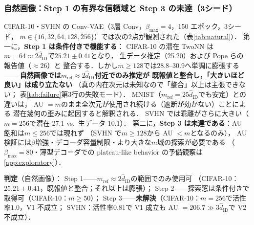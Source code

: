 \documentclass[11pt,a4paper]{jsarticle}
\newcommand{\hatdID}{\hat{d}_{\mathrm{ID}}}
\begin{document}
\subsubsection{自然画像：Step 1 の有界な信頼域と Step 3 の未達（3シード）}

CIFAR-10・SVHN の Conv-VAE（3層 Conv，$\beta_{\max} = 4$，150 エポック，3シード，
$m \in \{16, 32, 64, 128, 256\}$）では次の2点が観測された（表\ref{tab:natural}）．
第一に，\textbf{Step 1 は条件付きで機能する}：
CIFAR-10 の潜在 TwoNN は$m = 64 \approx 2\hatdID$で$25.21 \pm 0.41$となり，
生データ推定（25.20）および Pope ら\cite{pope2021intrinsic}の報告値（$\approx 26$）と
整合する．しかし$m \geq 128$では$28.8$--$30.9$へ単調に膨張する——
\textbf{自然画像では$m_{\mathrm{ref}} \approx 2\hatdID$付近でのみ推定が
既報値と整合し，「大きいほど良い」は成り立たない}
（真の内在次元は未知なので「整合」以上は主張できない；
表\ref{tab:failure}第3行の失敗モード）．
MNIST（$m_{\mathrm{ref}} = 25\hatdID$でも安定）との違いは，
AU $= m$のまま全次元が使用され続ける（遮断が効かない）ことによる
潜在幾何の歪みに起因すると解釈される．
SVHN では乖離がさらに大きい（$m = 256$で潜在 27.1 vs.\ 生データ 10.1）．
第二に，\textbf{Step 3 は未達である}：AU 飽和は$m \leq 256$では現れず
（SVHN で$m \geq 128$から AU $< m$となるのみ），
AU 検証には$\beta$増強・デコーダ容量制限・より大きな$m$域の探索が必要である
（$\beta_{\max} = 80$・薄型デコーダでの plateau-like behavior の予備観察は
\ref{app:exploratory}）．

\textbf{判定}（自然画像）：
Step 1——$m_{\mathrm{ref}} \approx 2\hatdID$の範囲でのみ使用可
（CIFAR-10：$25.21 \pm 0.41$，既報値と整合；それ以上は膨張）；
Step 2——探索窓は条件付きで取得可（CIFAR-10：$m \geq 50$）；
Step 3——\textbf{未解決}（CIFAR-10：$m = 256$で活性率$1.0$，V1 不成立；
SVHN：活性率$0.81$で V1 成立も AU $= 206.7 \gg 3\hatdID$で V2 不成立）．
\end{document}
